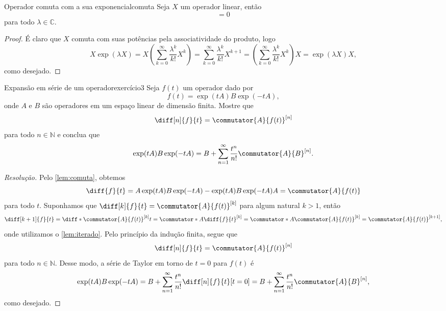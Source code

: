 \begin{lemma}{Operador comuta com a sua exponencial}{comuta}
    Seja \(X\) um operador linear, então
    \begin{equation*}
        [X, \exp(\lambda X)] = 0
    \end{equation*}
    para todo \(\lambda \in \mathbb{C}\).
\end{lemma}
\begin{proof}
    É claro que \(X\) comuta com suas potências pela associatividade do produto, logo
    \begin{equation*}
        X \exp(\lambda X) = X \left(\sum_{k=0}^\infty \frac{\lambda^k}{k!}X^k\right) = \sum_{k=0}^\infty \frac{\lambda^k}{k!}X^{k+1} = \left(\sum_{k=0}^\infty \frac{\lambda^k}{k!}X^k\right)X = \exp(\lambda X) X,
    \end{equation*}
    como desejado.
\end{proof}

\begin{exercício}{Expansão em série de um operador}{exercício3}
    Seja \(f(t)\) um operador dado por
    \begin{equation*}
        f(t) = \exp(tA) B\exp(-tA),
    \end{equation*}
    onde \(A\) e \(B\) são operadores em um espaço linear de dimensão finita. Mostre que
    \begin{equation*}
        \diff[n]{f}{t} = \commutator{A}{f(t)}^{[n]}
    \end{equation*}
    para todo \(n \in \mathbb{N}\) e conclua que
    \begin{equation*}
        \exp(tA)B\exp(-tA) = B + \sum_{n = 1}^\infty \frac{t^n}{n!}\commutator{A}{B}^{[n]}.
    \end{equation*}
\end{exercício}
\begin{proof}[Resolução]
    Pelo \cref{lem:comuta}, obtemos
    \begin{equation*}
        \diff{f}{t} = A \exp(tA) B\exp(-tA) - \exp(tA) B\exp(-tA) A = \commutator{A}{f(t)}
    \end{equation*}
    para todo \(t\). Suponhamos que \(\diff[k]{f}{t} = \commutator{A}{f(t)}^{[k]}\) para algum natural \(k > 1\), então
    \begin{equation*}
        \diff[k+1]{f}{t} = \diff*{\commutator{A}{f(t)}^{[k]}}{t} = \commutator*{A}{\diff{f}{t}}^{[k]} = \commutator*{A}{\commutator{A}{f(t)}}^{[k]} = \commutator{A}{f(t)}^{[k+1]},
    \end{equation*}
    onde utilizamos o \cref{lem:iterado}. Pelo princípio da indução finita, segue que
    \begin{equation*}
        \diff[n]{f}{t} = \commutator{A}{f(t)}^{[n]}
    \end{equation*}
    para todo \(n \in \mathbb{N}\). Desse modo, a série de Taylor em torno de \(t = 0\) para \(f(t)\) é
    \begin{equation*}
        \exp(tA)B\exp(-tA) = B + \sum_{n = 1}^{\infty} \frac{t^n}{n!}\diff[n]{f}{t}[t=0] = B + \sum_{n = 1}^{\infty} \frac{t^n}{n!}\commutator{A}{B}^{[n]},
    \end{equation*}
    como desejado.
\end{proof}
